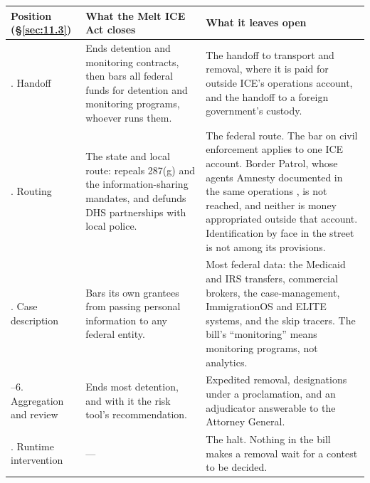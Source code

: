
\begingroup\small\renewcommand{\arraystretch}{1.12}
\begin{longtable}{@{}>{\raggedright\arraybackslash}p{}>{\raggedright\arraybackslash}p{}>{\raggedright\arraybackslash}p{}@{}}
\hline
\textbf{Position (\S\ref{sec:11.3})} & \textbf{What the Melt ICE Act closes} & \textbf{What it leaves open} \\
\hline
\endhead
8. Handoff & Ends detention and monitoring contracts, then bars all federal funds for detention and monitoring programs, whoever runs them. & The handoff to transport and removal, where it is paid for outside ICE's operations account, and the handoff to a foreign government's custody. \\ \hline
2. Routing & The state and local route: repeals 287(g) and the information-sharing mandates, and defunds DHS partnerships with local police. & The federal route. The bar on civil enforcement applies to one ICE account. Border Patrol, whose agents Amnesty documented in the same operations \autocite{Amnesty2026Whistles}, is not reached, and neither is money appropriated outside that account. Identification by face in the street is not among its provisions. \\ \hline
3. Case description & Bars its own grantees from passing personal information to any federal entity. & Most federal data: the Medicaid and IRS transfers, commercial brokers, the case-management, ImmigrationOS and ELITE systems, and the skip tracers. The bill's “monitoring” means monitoring programs, not analytics. \\ \hline
5–6. Aggregation and review & Ends most detention, and with it the risk tool's recommendation. & Expedited removal, designations under a proclamation, and an adjudicator answerable to the Attorney General. \\ \hline
9. Runtime intervention & — & The halt. Nothing in the bill makes a removal wait for a contest to be decided. \\ \hline
\end{longtable}
\endgroup

